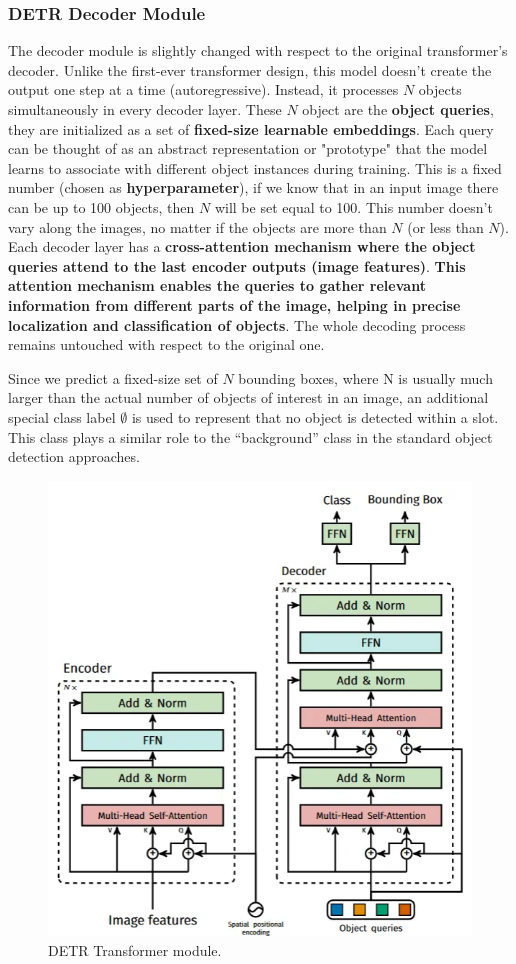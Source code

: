 \documentclass[12pt]{article}
\begin{document}
\subsubsection{DETR Decoder Module}
The decoder module is slightly changed with respect to the original transformer's decoder. 
Unlike the first-ever transformer design, this model doesn't create the output one step at a 
time (autoregressive). Instead, it processes $N$ objects simultaneously in every decoder layer. These $N$
object are the \textbf{object queries}, they are initialized as a set of \textbf{fixed-size learnable embeddings}. 
Each query can be thought of as an abstract representation or "prototype" that the model learns to 
associate with different object instances during training. This is a fixed number 
(chosen as \textbf{hyperparameter}), if we know that in an input image there can 
be up to 100 objects, then $N$ will be set equal to 100. This number doesn't vary along the images, no matter 
if the objects are more than $N$ (or less than $N$). Each decoder layer has a \textbf{cross-attention mechanism 
where the object queries attend to the last encoder outputs (image features)}.
\textbf{This attention mechanism enables the queries to gather relevant information from different parts of the 
image, helping in precise localization and classification of objects}. The whole decoding process remains 
untouched with respect to the original one.

Since we predict a fixed-size set of $N$ bounding boxes, where N is usually much larger than the actual 
number of objects of interest in an image, an additional special class label $\emptyset$ is used to represent that
no object is detected within a slot. This class plays a similar role to the “background” class in the 
standard object detection approaches.

\begin{figure}
    \centering
    \includegraphics[width=.5\textwidth]{Images/detr_transformer_module.png}
    \caption{DETR Transformer module.}
    \label{fig:detr_transformer_module}
\end{figure}
\end{document}

